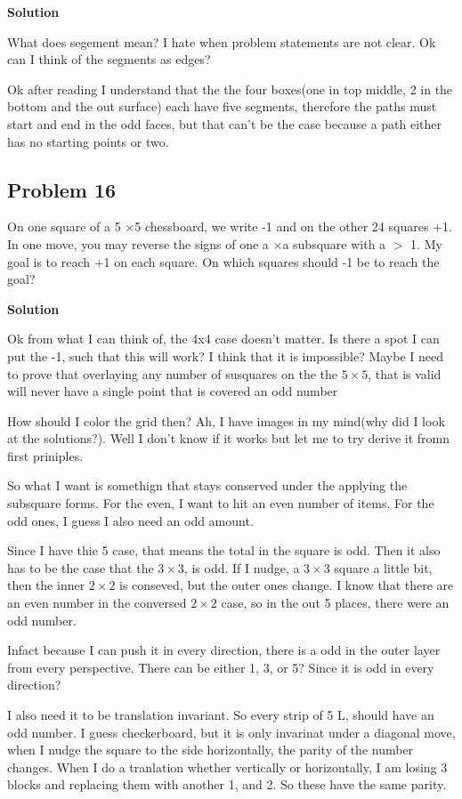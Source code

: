 \documentclass{article}
\begin{document}
\textbf{Solution}

What does segement mean? I hate when problem statements are not clear. Ok can I think of the segments as edges?

Ok after reading I understand that the the four boxes(one in top middle, 2 in the bottom and the out surface)
each have five segments, therefore the paths must start and end in the odd faces, but that can't be the case 
because a path either has no starting points or two.

\subsection{Problem 16}

On one square of a 5 ×5 chessboard, we write -1 and on the other 24 squares +1.
In one move, you may reverse the signs of one a ×a subsquare with a $>$ 1. My goal
is to reach +1 on each square. On which squares should -1 be to reach the goal?

\textbf{Solution}

Ok from what I can think of, the 4x4 case doesn't matter.
Is there a spot I can put the -1, such that this will work? I think that it is
impossible? Maybe I need to prove that overlaying any number of susquares on the 
the $5\times 5$, that is valid will never have a single point that is covered an odd number

How should I color the grid then? Ah, I have images in my mind(why did I look at the solutions?).
Well I don't know if it works but let me to try derive it fromn first priniples.

So what I want is somethign that stays conserved under the applying the subsquare forms.
For the even, I want to hit an even number of items. For the odd ones, I guess I also need an odd amount. 

Since I have thie 5 case, that means the total in the square is odd. Then it also has to be 
the case that the $3\times 3$, is odd. If I nudge, a $3\times 3$ square a little bit,
then the inner $2\times 2$ is conseved, but the outer ones change. I know that there are an 
even number in the conversed $2\times 2$ case, so in the out 5 places, there were an odd number.

Infact because I can push it in every direction, there is a odd in the outer layer from every 
perspective. There can be either 1, 3, or 5? Since it is odd in every direction?

I also need it to be translation invariant. So every strip of 5 L, should have an odd number. I guess checkerboard,
but it is only invarinat under a diagonal move, when I nudge the square to the side horizontally, the 
parity of the number changes. When I do a tranlation whether vertically or horizontally, I am losing 
3 blocks and replacing them with another 1, and 2. So these have the same parity.
\end{document}
